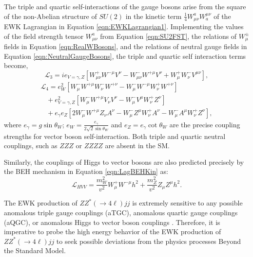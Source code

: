 The triple and quartic self-interactions of the gauge bosons arise from the square of the non-Abelian structure of $SU(2)$ in the kinetic term $ \frac{1}{4} W^{a}_{\mu\nu} W^{\mu\nu}_{a}$ of the EWK Lagrangian in Equation \ref{eqn:EWKLagrangian1}. Implementing the values of the field strength tensor $W^{a}_{\mu\nu}$ from Equation \ref{eqn:SU2FST}, the relations of $W_{\mu}^{\pm}$ fields in Equation \ref{eqn:RealWBosons}, and the relations of neutral gauge fields in Equation \ref{eqn:NeutralGaugeBosons}, the triple and quartic self interaction terms become, 
\begin{equation}
\mathcal{L}_{3} = ie_{V=\gamma,Z} [ W^{+}_{\mu\nu} W^{-\mu} V^{\nu} - W^{-}_{\mu\nu} W^{+\mu} V^{\nu} + W_{\mu}^{+}W_{\nu}^{-}V^{\mu\nu} ], 
\label{eqn:L_TGC}
\end{equation}
\begin{equation}
\begin{array}{l}
\mathcal{L}_{4} = e^{2}_{W} [ W^{-}_{\mu}W^{+\mu}W^{-}_{\nu}W^{+\nu} - W^{-}_{\mu}W^{-\mu}W^{+}_{\nu}W^{+\nu} ] \\
 \hspace{10pt} + e^2_{V=\gamma,Z} [ W^{-}_{\mu}W^{+\mu}V_{\nu}V^{\nu} - W^{-}_{\mu}V^{\mu}W^{+}_{\nu}Z^{\nu} ] \\
  \hspace{10pt} + e_{\gamma}e_{Z} [ 2W^{-}_{\mu} W^{+\mu} Z_{\nu}A^{\nu} - W_{\mu}^{-}Z^{\mu}W^{+}_{\nu}A^{\nu} - W_{\mu}^{-}A^{\mu}W^{+}_{\nu}Z^{\nu} ],
\end{array}
\label{eqn:L_QGC}
\end{equation}
where $e_{\gamma} = g\sin\theta_{W}$; $e_{W} = \frac{e_{\gamma}}{2\sqrt{2}\sin\theta_{W}}$ and $e_{Z} = e_{\gamma}\cot\theta_{W}$ are the precise coupling strengths for vector boson self-interaction. Both triple and quartic neutral couplings, such as $ZZZ$ or $ZZZZ$ are absent in the SM. 

Similarly, the couplings of Higgs to vector bosons are also predicted precisely by the BEH mechanism in Equation \ref{eqn:LagBEHKin} as:
\begin{equation}
\mathcal{L}_{HVV} = \frac{m_{W}^2}{v^2} W^{+}_{\mu}W^{-\mu}h^{2} + \frac{m_{Z}^{2}}{v^2} Z_{\mu}Z^{\mu}h^{2}.
\label{eqn:HVVCoupling}
\end{equation}

The EWK production of $ZZ^*(\rightarrow 4\ell ) jj$ is extremely sensitive to any possible anomalous triple gauge couplings (aTGC), anomalous quartic gauge couplings (aQGC), or anomalous Higgs to vector boson couplings \cite{SensitivityNP} \cite{EFT_Eboli} \cite{BSM_Simple2HDM}. Therefore, it is imperative to probe the high energy behavior of the EWK production of $ZZ^*(\rightarrow 4\ell ) jj$ to seek possible deviations from the physics processes Beyond the Standard Model. 

